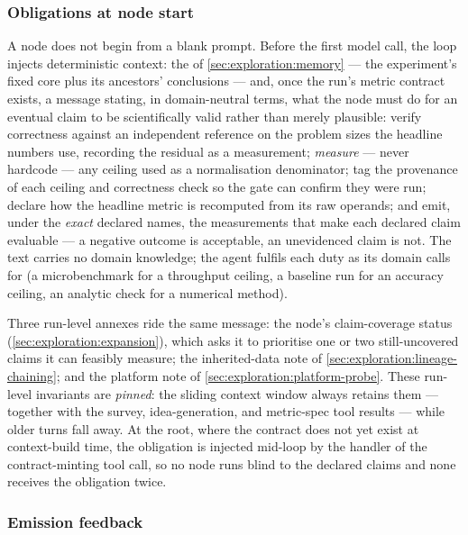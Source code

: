 \subsubsection*{Obligations at node start}

A node does not begin from a blank prompt. Before the first model
call, the loop injects deterministic context: the  of \cref{sec:exploration:memory} --- the experiment's fixed
core plus its ancestors' conclusions --- and, once the run's metric
contract exists, a  message stating, in
domain-neutral terms, what the node must do for an eventual claim to
be scientifically valid rather than merely plausible: verify
correctness against an independent reference on the problem sizes the
headline numbers use, recording the residual as a measurement;
\emph{measure} --- never hardcode --- any ceiling used as a
normalisation denominator; tag the provenance of each ceiling and
correctness check so the gate can confirm they were run; declare how
the headline metric is recomputed from its raw operands; and emit,
under the \emph{exact} declared names, the measurements that make
each declared claim evaluable --- a negative outcome is acceptable,
an unevidenced claim is not. The text carries no domain knowledge;
the agent fulfils each duty as its domain calls for (a microbenchmark
for a throughput ceiling, a baseline run for an accuracy ceiling, an
analytic check for a numerical method).

Three run-level annexes ride the same message: the node's
claim-coverage status (\cref{sec:exploration:expansion}), which asks
it to prioritise one or two still-uncovered claims it can feasibly
measure; the inherited-data note of
\cref{sec:exploration:lineage-chaining}; and the platform note of
\cref{sec:exploration:platform-probe}. These run-level invariants are
\emph{pinned}: the sliding context window always retains them ---
together with the survey, idea-generation, and metric-spec tool
results --- while older turns fall away. At the root, where the
contract does not yet exist at context-build time, the obligation is
injected mid-loop by the handler of the contract-minting tool call,
so no node runs blind to the declared claims and none receives the
obligation twice.

\subsubsection*{Emission feedback}

